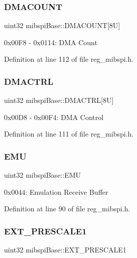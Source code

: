 \subsubsection{\texorpdfstring{D\+M\+A\+C\+O\+U\+NT}{DMACOUNT}}
{\footnotesize\ttfamily uint32 mibspi\+Base\+::\+D\+M\+A\+C\+O\+U\+NT\mbox{[}8\+U\mbox{]}}

0x00\+F8 -\/ 0x0114\+: D\+MA Count 

Definition at line 112 of file reg\+\_\+mibspi.\+h.

\mbox{\label{structmibspiBase_a20dfe9f5fcfad9e59148380590e72882}} 
\subsubsection{\texorpdfstring{D\+M\+A\+C\+T\+RL}{DMACTRL}}
{\footnotesize\ttfamily uint32 mibspi\+Base\+::\+D\+M\+A\+C\+T\+RL\mbox{[}8\+U\mbox{]}}

0x00\+D8 -\/ 0x00\+F4\+: D\+MA Control 

Definition at line 111 of file reg\+\_\+mibspi.\+h.

\mbox{\label{structmibspiBase_a27d5993b7a0a5f4bb464b99249742aef}} 
\subsubsection{\texorpdfstring{E\+MU}{EMU}}
{\footnotesize\ttfamily uint32 mibspi\+Base\+::\+E\+MU}

0x0044\+: Emulation Receive Buffer 

Definition at line 90 of file reg\+\_\+mibspi.\+h.

\mbox{\label{structmibspiBase_a23996aa9c43307db447af3b0db7bac4a}} 
\subsubsection{\texorpdfstring{E\+X\+T\+\_\+\+P\+R\+E\+S\+C\+A\+L\+E1}{EXT\_PRESCALE1}}
{\footnotesize\ttfamily uint32 mibspi\+Base\+::\+E\+X\+T\+\_\+\+P\+R\+E\+S\+C\+A\+L\+E1}

